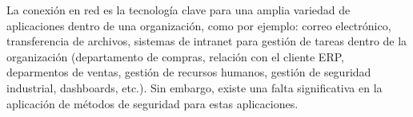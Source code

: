 

La conexión en red es la tecnología clave para una amplia variedad 
de aplicaciones dentro de una organización, como por ejemplo: correo electrónico, 
transferencia de archivos, sistemas de intranet para gestión de tareas dentro de la 
organización (departamento de compras, relación con el cliente ERP, deparmentos de ventas,
gestión de recursos humanos, gestión de seguridad industrial, dashboards, etc.).
Sin embargo, existe una falta significativa en la aplicación de métodos de seguridad 
para estas aplicaciones.

    






